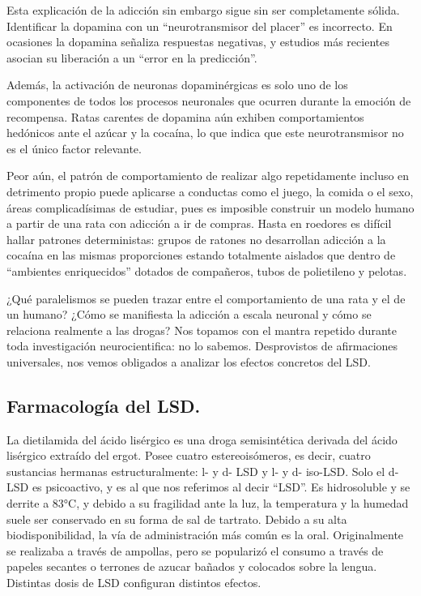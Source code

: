 Esta explicación de la adicción sin embargo sigue sin ser completamente sólida. Identificar la dopamina con un \enquote{neurotransmisor del placer} es incorrecto. En ocasiones la dopamina señaliza respuestas negativas, y estudios más recientes asocian su liberación a un \enquote{error en la predicción}.

Además, la activación de neuronas dopaminérgicas es solo uno de los componentes de todos los procesos neuronales que ocurren durante la emoción de recompensa. Ratas carentes de dopamina aún exhiben comportamientos hedónicos ante el azúcar y la cocaína, lo que indica que este neurotransmisor no es el único factor relevante.

Peor aún, el patrón de comportamiento de realizar algo repetidamente incluso en detrimento propio puede aplicarse a conductas como el juego, la comida o el sexo, áreas complicadísimas de estudiar, pues es imposible construir un modelo humano a partir de una rata con adicción a ir de compras. Hasta en roedores es difícil hallar patrones deterministas: grupos de ratones no desarrollan adicción a la cocaína en las mismas proporciones estando totalmente aislados que dentro de \enquote{ambientes enriquecidos} dotados de compañeros, tubos de polietileno y pelotas.

¿Qué paralelismos se pueden trazar entre el comportamiento de una rata y el de un humano? ¿Cómo se manifiesta la adicción a escala neuronal y cómo se relaciona realmente a las drogas? Nos topamos con el mantra repetido durante toda investigación neurocientifica: no lo sabemos. Desprovistos de afirmaciones universales, nos vemos obligados a analizar los efectos concretos del LSD.

\newpage

\subsection{Farmacología del LSD.}

La dietilamida del ácido lisérgico es una droga semisintética derivada del ácido lisérgico extraído del ergot. Posee cuatro estereoisómeros, es decir, cuatro sustancias hermanas estructuralmente: l- y d- LSD y l- y d- iso-LSD. Solo el d-LSD es psicoactivo, y es al que nos referimos al decir \enquote{LSD}. Es hidrosoluble y se derrite a 83°C, y debido a su fragilidad ante la luz, la temperatura y la humedad suele ser conservado en su forma de sal de tartrato. Debido a su alta biodisponibilidad, la vía de administración más común es la oral. Originalmente se realizaba a través de ampollas, pero se popularizó el consumo a través de papeles secantes o terrones de azucar bañados y colocados sobre la lengua. Distintas dosis de LSD configuran distintos efectos.

